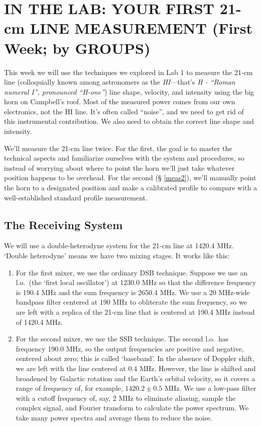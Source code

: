 \documentclass[12pt,preprint]{aastex}
\begin{document}
\section{IN THE LAB: YOUR FIRST 21-cm LINE MEASUREMENT (First Week; by GROUPS)} 
\label{radioastro}

This week we will use the techniques we explored in Lab 1 to measure the
21-cm line (colloquially known among astronomers as the {\it
  HI}---that's {\it H - ``Roman numeral I'', pronounced ``H-one''}) line
shape, velocity, and intensity using the big horn on Campbell's roof.
Most of the measured power comes from our own electronics, not the HI
line.  It's often called ``noise'', and we need to get rid of this
instrumental contribution. We also need to obtain the correct line shape
and intensity.

We'll measure the 21-cm line twice. For the first, the goal is to master
the technical aspects and familiarize ourselves with the system and
procedures, so instead of worrying about where to point the horn we'll
just take whatever position happens to be overhead. For the second (\S
\ref{meas2}), we'll manually point the horn to a designated position and
make a calibrated profile to compare with a well-established standard
profile measurement.

\subsection{The Receiving System}
We will use a double-heterodyne system for the 21-cm line at 1420.4 MHz.
`Double heterodyne' means we have two mixing stages.  It works
like this: \begin{enumerate}

\item For the first mixer, we use the ordinary DSB technique. Suppose we
  use an l.o.\ (the `first local oscillator') at 1230.0 MHz so that the
  difference frequency is 190.4 MHz and the sum frequency is 2650.4 MHz.
  We use a 20 MHz-wide bandpass filter centered at 190 MHz to obliterate
  the sum frequency, so we are left with a replica of the 21-cm line
  that is centered at 190.4 MHz instead of 1420.4 MHz.

\item For the second mixer, we use the SSB technique. The second
  l.o.\ has frequency 190.0 MHz, so the output frequencies are positive
  and negative, centered about zero; this is called `baseband'. In the
  absence of Doppler shift, we are left with the line centered at 0.4
  MHz. However, the line is shifted and broadened by Galactic rotation
  and the Earth's orbital velocity, so it covers a range of frequency
  of, for example, $1420.2 \pm 0.5$ MHz. We use a low-pass filter with a
  cutoff frequency of, say, 2 MHz to
  eliminate aliasing, sample the complex signal, and Fourier transform
  to calculate the power spectrum. We take many power spectra and
  average them to reduce the noise.

\end{enumerate}
\end{document}
